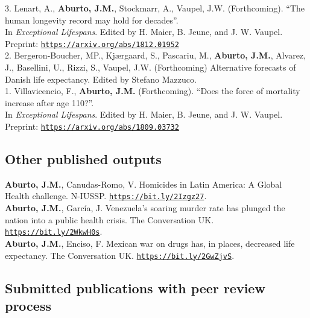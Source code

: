 \documentclass[12pt]{article}
\providecommand*\url[1]{\href{#1}{#1}}
\renewcommand*\url[1]{\href{#1}{\texttt{#1}}}
\begin{document}
3. Lenart, A., \textbf{Aburto, J.M.}, Stockmarr, A., Vaupel, J.W. (Forthcoming). ``The human longevity record may hold for decades''.\\ In \emph{Exceptional Lifespans}. Edited by H. Maier, B. Jeune, and J. W. Vaupel. \\ 
Preprint: \url{https://arxiv.org/abs/1812.01952}\\

2. Bergeron-Boucher, MP., Kj{\ae}rgaard, S.,  Pascariu, M., \textbf{Aburto, J.M.},  Alvarez, J., Basellini, U.,  Rizzi, S., Vaupel, J.W. (Forthcoming) Alternative forecasts of Danish life expectancy. Edited by Stefano Mazzuco.\\

1. Villavicencio, F., \textbf{Aburto, J.M.} (Forthcoming). ``Does the force of mortality increase after age 110?''.\\ In \emph{Exceptional Lifespans}. Edited by H. Maier, B. Jeune, and J. W. Vaupel. \\
Preprint: \url{https://arxiv.org/abs/1809.03732}\\
		  		  
\subsection*{Other published outputs}	

\textbf{Aburto, J.M.}, Canudas-Romo, V. Homicides in Latin America: A Global Health challenge. N-IUSSP. \url{https://bit.ly/2Izgz27}.\\

\textbf{Aburto, J.M.}, Garc\'ia, J. Venezuela's soaring murder rate has plunged the nation into a public health crisis. The Conversation UK. \url{https://bit.ly/2WkwH0s}.\\

\textbf{Aburto, J.M.}, Enciso, F. Mexican war on drugs has, in places, decreased life expectancy. The Conversation UK. \url{https://bit.ly/2GwZjvS}.\\

\subsection*{Submitted publications with peer review process}	
 
\end{document}
